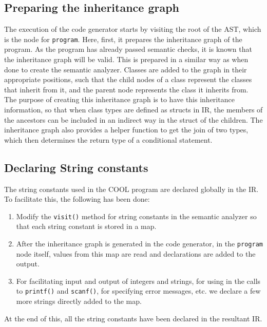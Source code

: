 \documentclass{article}
\begin{document}
\subsection{Preparing the inheritance graph}
The execution of the code generator starts by visiting the root of the AST, which is the node for \verb|program|. Here, first, it prepares the inheritance graph of the program. As the program has already passed semantic checks, it is known that the inheritance graph will be valid. This is prepared in a similar way as when done to create the semantic analyzer. Classes are added to the graph in their appropriate positions, such that the child nodes of a class represent the classes that inherit from it, and the parent node represents the class it inherits from. The purpose of creating this inheritance graph is to have this inheritance information, so that when class types are defined as structs in IR, the members of the ancestors can be included in an indirect way in the struct of the children. The inheritance graph also provides a helper function to get the join of two types, which then determines the return type of a conditional statement.

\subsection{Declaring String constants}
The string constants used in the COOL program are declared globally in the IR. To facilitate this, the following has been done:
\begin{enumerate}
	\item Modify the \verb|visit()| method for string constants in the semantic analyzer so that each string constant is stored in a map.
	\item After the inheritance graph is generated in the code generator, in the \verb|program| node itself, values from this map are read and declarations are added to the output.
	\item For facilitating input and output of integers and strings, for using in the calls to \verb|printf()| and \verb|scanf()|, for specifying error messages, etc. we declare a few more strings directly added to the map.
\end{enumerate} 
At the end of this, all the string constants have been declared in the resultant IR.
\end{document}
